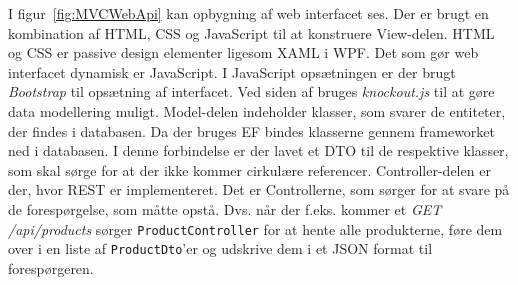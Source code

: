 I figur~\ref{fig:MVCWebApi} kan opbygning af web interfacet ses. 
Der er brugt en kombination af HTML, CSS og JavaScript til at konstruere View-delen. HTML og CSS er passive design elementer ligesom \gls{XAML} i \gls{WPF}. Det som gør web interfacet dynamisk er JavaScript. I JavaScript opsætningen er der brugt \textit{Bootstrap} til opsætning af interfacet. Ved siden af bruges \textit{knockout.js} til at gøre data modellering muligt.
\newline\newline
Model-delen indeholder klasser, som svarer de entiteter, der findes i databasen. Da der bruges \gls{EF} bindes klasserne gennem frameworket ned i databasen. I denne forbindelse er der lavet et \gls{DTO} til de respektive klasser, som skal sørge for at der ikke kommer cirkulære referencer. 
\newline\newline
Controller-delen er der, hvor \gls{REST} er implementeret. Det er Controllerne, som sørger for at svare på de forespørgelse, som måtte opstå. Dvs. når der f.eks. kommer et \textit{GET /api/products} sørger \texttt{ProductController} for at hente alle produkterne, føre dem over i en liste af \texttt{ProductDto}'er og udskrive dem i et JSON format til forespørgeren.